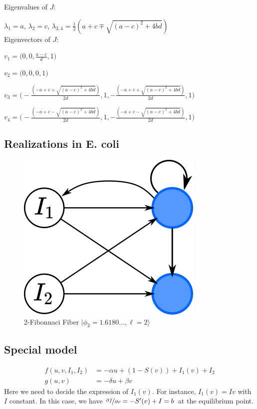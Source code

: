 \documentclass[12pt]{article}
\begin{document}
Eigenvalues of $J$:

$\lambda_1 = a$, $\lambda_2 = c$, 
$\lambda_{3,4} = \frac{1}{2}(a+c \mp \sqrt{(a-c)^2 + 4bd})$\\[0.2cm]

Eigenvectors of $J$:

$ v_1 = \Big( 0, 0, \frac{a-c}{d}, 1 \Big)$

$ v_2 = \Big( 0, 0, 0, 1 \Big)$

$ v_3 = \Big( -\frac{(-a + c + \sqrt{(a-c)^2 + 4bd})}{2d}, 
        1, -\frac{(-a + c + \sqrt{(a-c)^2 + 4bd})}{2d}, 1 \Big)$

$ v_4 = \Big( -\frac{(-a + c - \sqrt{(a-c)^2 + 4bd})}{2d}, 
        1, -\frac{(-a + c - \sqrt{(a-c)^2 + 4bd})}{2d}, 1 \Big)$\\[0.2cm]

\subsection{Realizations in E. coli}

\begin{figure}[H]
    \centering
    \includegraphics[scale=0.6]{figs/fibo2_ecoli.png}
    \caption{2-Fibonnaci Fiber $|\phi_2 = 1.6180..., \ell = 2\rangle$}
    \label{fig:fig4_l2}
\end{figure}

\subsection{Special model}

\begin{equation}
    \begin{aligned}
        f(u,v,I_1, I_2) &= -\alpha u + (1-S(v)) + I_1(v) + I_2\\
        g(u,v) &= -\delta u + \beta v
    \end{aligned}
\end{equation}
Here we need to decide the expression 
of $I_1(v)$. For instance, $I_1(v) = Iv$ 
with $I$ constant. In this case, we have 
$\nicefrac{\partial f}{\partial v} = -S'(v) + I = b$ 
at the equilibrium point.
\end{document}
